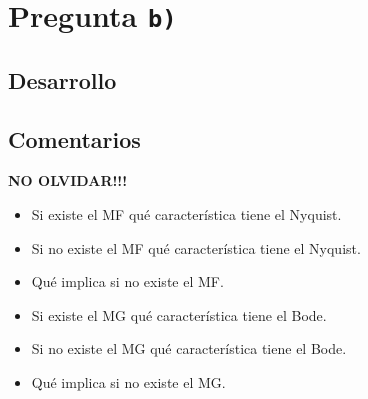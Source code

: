 \section{Pregunta \texttt{b)}}\label{pregunta-b}


\subsection{Desarrollo}


\FloatBarrier
\subsection{Comentarios}

\textbf{NO OLVIDAR!!!}

\begin{itemize}
  \item Si existe el MF qué característica tiene el Nyquist.
  \item Si no existe el MF qué característica tiene el Nyquist.
  \item Qué implica si no existe el MF.
  \item Si existe el MG qué característica tiene el Bode.
  \item Si no existe el MG qué característica tiene el Bode.
  \item Qué implica si no existe el MG.
\end{itemize}
